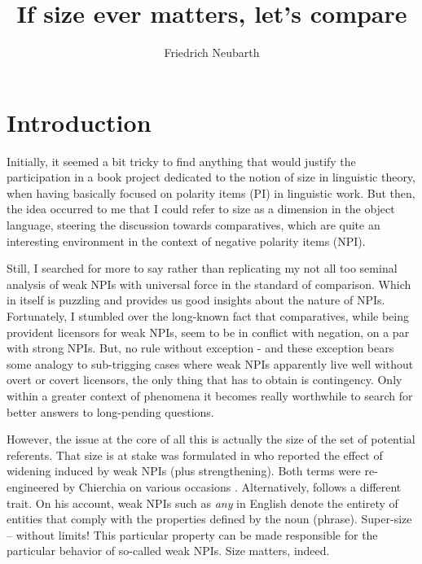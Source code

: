 \documentclass[output=paper,colorlinks,citecolor=brown,
]{langscibook}
\author{Friedrich Neubarth\affiliation{Austrian Research Institute for Artificial Intelligence (OFAI); University of Vienna}}
\title{If size ever matters, let's compare}
\begin{document}
\maketitle


\section{Introduction}

Initially, it seemed a bit tricky to find anything that would justify the participation in a book project dedicated to
the notion of size in linguistic theory, when having basically focused on polarity items (PI) in linguistic work. But
then, the idea occurred to me that I could refer to size as a dimension in the object language, steering the discussion
towards comparatives, which are quite an interesting environment in the context of negative polarity items (NPI).

Still, I searched for more to say rather than replicating my not all too seminal analysis of weak NPIs with universal
force in the standard of comparison. Which in itself is puzzling and provides us good insights about the nature of
NPIs. Fortunately, I stumbled over the long-known fact that comparatives, while being provident licensors for weak NPIs,
seem to be in conflict with negation, on a par with strong NPIs. But, no rule without exception - and these exception
bears some analogy to sub-trigging cases where weak NPIs apparently live well without overt or covert licensors, the
only thing that has to obtain is contingency. Only within a greater context of phenomena it becomes really worthwhile
to search for better answers to long-pending questions.

However, the issue at the core of all this is actually the size of the set of potential referents. That size is at
stake was formulated in \citet{kadmonlandmann1993} who reported the effect of widening induced by weak NPIs (plus
strengthening). Both terms were re-engineered by Chierchia on various occasions \citet{chierchia2004,chierchia2013}.
Alternatively, \citet{krifka1995} follows a different trait. On his account, weak NPIs such as \textit{any} in English
denote the entirety of entities that comply with the properties defined by the noun (phrase). Super-size -- without limits!
This particular property can be made responsible for the particular behavior of so-called weak NPIs. Size matters,
indeed.
\end{document}
